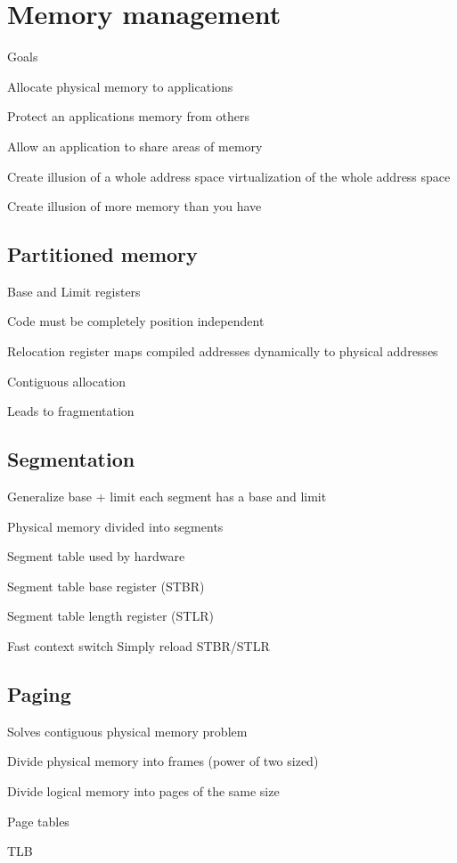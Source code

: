 \section{Memory management}
\enumstart
	\item Goals
	\enumstart
		\item Allocate physical memory to applications
		\item Protect an applications memory from others
		\item Allow an application to share areas of memory
		\item Create illusion of a whole address space \arrow virtualization of the whole address space
		\item Create illusion of more memory than you have
	\enumend
\enumend

\subsection{Partitioned memory}
\enumstart
	\item Base and Limit registers
	\item Code must be completely position independent
	\item Relocation register maps compiled addresses dynamically to physical addresses
	\item Contiguous allocation
	\item Leads to fragmentation
\enumend

\subsection{Segmentation}
\enumstart
	\item Generalize base + limit \arrow each segment has a base and limit
	\item Physical memory divided into segments
	\item Segment table \arrow used by hardware
	\item Segment table base register (STBR)
	\item Segment table length register (STLR)
	\item Fast context switch \arrow Simply reload STBR/STLR
\enumend

\subsection{Paging}
\enumstart
	\item Solves contiguous physical memory problem
	\item Divide physical memory into frames (power of two sized)
	\item Divide logical memory into pages of the same size
	\item Page tables
	\item TLB
\enumend

